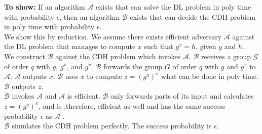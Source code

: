 \textbf{To show:} If an algorithm \(\mathcal{A}\) exists that can solve the DL problem in poly time with probability \(\epsilon\), then an algorithm  \(\mathcal{B}\) exists that can decide the CDH problem in poly time with probability \(\epsilon\).\\
We show this by reduction. 
We assume there exists efficient adversary \(\mathcal{A}\) against the DL problem that manages to compute $x$ such that $g^{x} = h$, given $g$ and $h$.\\
We construct \(\mathcal{B}\) against the CDH problem which invokes \(\mathcal{A}\). 
\(\mathcal{B}\) receives a group \(\mathcal{G}\) of order \(q\) with \(g\), \(g^x\), and \(g^y\).
\(\mathcal{B}\) forwards the group \(G\) of order \(q\) with \(g\) and \(g^x\) to \(\mathcal{A}\). 
\(\mathcal{A}\) outputs $x$. 
\(\mathcal{B}\) uses $x$ to compute $z = (g^{y})^{x}$ what can be done in poly time.
\(\mathcal{B}\) outputs $z$.\\
\(\mathcal{B}\) invokes \(\mathcal{A}\) and \(\mathcal{A}\) is efficient. 
\(\mathcal{B}\) only forwards parts of its input and calculates $z = (g^{y})^{x}$, and is ,therefore, efficient as well and has the same success probability \(\epsilon\) as \(\mathcal{A}\) .\\
\(\mathcal{B}\) simulates the CDH problem perfectly. The success probability is \(\epsilon\).
